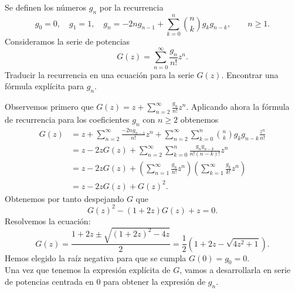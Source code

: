 \documentclass[twoside]{article}
\newcommand{\sumno}{\sum_{n=0}^{\infty}}
\newcommand{\sumn}{\sum_{n=1}^{\infty}}
\begin{document}
\newpage 
\begin{ejercicio}{8}
Se definen los números $g_n$ por la recurrencia \begin{equation*}
g_0 = 0, \quad g_1 = 1, \quad g_n = -2ng_{n-1} + \sum_{k=0}^n \binom{n}{k}g_k g_{n-k}, \qquad n \geq 1.
\end{equation*}
Consideramos la serie de potencias \begin{equation*}
G(z) = \sumno \frac{g_n}{n!}z^n.
\end{equation*}
Traducir la recurrencia en una ecuación para la serie $G(z)$. Encontrar una fórmula explícita para $g_n$.
\end{ejercicio}
\begin{solucion}
Observemos primero que $G(z) = z + \sum_{n=2}^{\infty} \frac{g_n}{n!}z^n$. Aplicando ahora la fórmula de recurrencia para los coeficientes $g_n$ con $n \geq 2$ obtenemos \begin{equation*}
\begin{split}
G(z) & =  z+ \sum_{n=2}^\infty \frac{-2ng_{n-1}}{n!} z^n + \sum_{n=2}^\infty \sum_{k=0}^n \binom{n}{k}g_kg_{n-k} \frac{z^n}{n!} \\ & = z -2zG(z) + \sum_{n=2}^\infty \sum_{k=0}^n \frac{g_n g_{n-k}}{n!(n-k)!}z^n \\ & = z - 2zG(z) + \left(\sumn \frac{g_n}{n!}z^n \right) \left( \sum_{k=1}^\infty \frac{g_k}{k!}z^n \right) \\ & = z - 2zG(z) + G(z)^2.
\end{split}
\end{equation*}
Obtenemos por tanto despejando $G$ que \begin{equation*}
G(z)^2 - (1+2z)G(z) + z = 0.
\end{equation*}
Resolvemos la ecuación: \begin{equation*}
G(z) = \frac{1+2z \pm \sqrt{(1+2z)^2 - 4z}}{2} = \frac{1}{2} \left( 1 + 2z - \sqrt{4z^2+1} \right).
\end{equation*}
Hemos elegido la raíz negativa para que se cumpla $G(0) = g_0 = 0$. \\
Una vez que tenemos la expresión explícita de $G$, vamos a desarrollarla en serie de potencias centrada en 0 para obtener la expresión de $g_n$.


\end{solucion}
\end{document}
